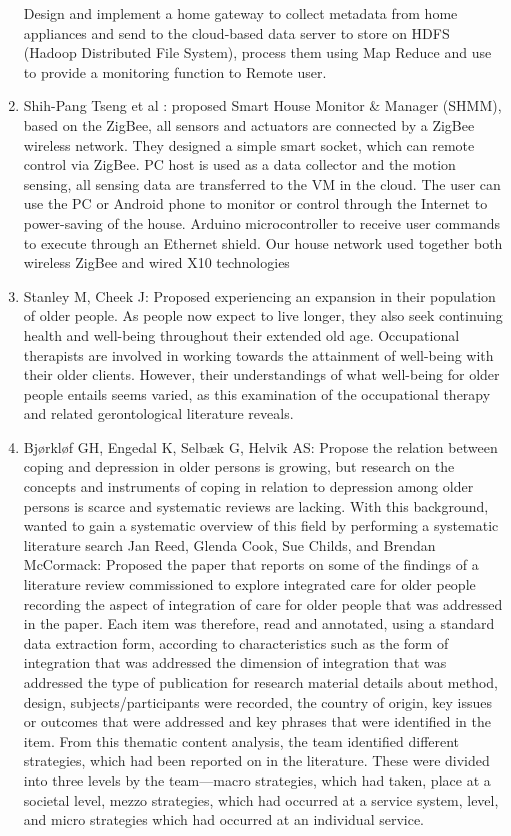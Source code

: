 \begin{enumerate}
	Design and implement a home gateway to collect metadata from home appliances and send to the cloud-based data server to store on HDFS (Hadoop Distributed File System), process them using Map Reduce and use to provide a monitoring function to Remote user.
	\item Shih-Pang Tseng et al : proposed Smart House Monitor \& Manager (SHMM), based on the ZigBee, all sensors and actuators are connected by a ZigBee wireless network. They designed a simple smart socket, which can remote control via ZigBee. PC host is used as a data collector and the motion sensing, all sensing data are transferred to the VM in the cloud. The user can use the PC or Android phone to monitor or control through the Internet to power-saving of the house. Arduino microcontroller to receive user commands to execute through an Ethernet shield. Our house network used together both wireless ZigBee and wired X10 technologies
\item  Stanley M, Cheek J: Proposed experiencing an expansion in their population of older people. As people now expect to live longer, they also seek continuing health and well-being throughout their extended old age. Occupational therapists are involved in working towards the attainment of well-being with their older clients. However, their understandings of what well-being for older people entails seems varied, as this examination of the occupational therapy and related gerontological literature reveals.
	\item  Bjørkløf GH, Engedal K, Selbæk G, Helvik AS: Propose the relation between coping and depression in older persons is growing, but research on the concepts and instruments of coping in relation to depression among older persons is scarce and systematic reviews are lacking. With this background, wanted to gain a systematic overview of this field by performing a systematic literature search Jan Reed, Glenda Cook, Sue Childs, and Brendan McCormack: Proposed the paper that reports on some of the findings of a literature review commissioned to explore integrated care for older people recording the aspect of integration of care for older people that was addressed in the paper. Each item was therefore, read and annotated, using a standard data extraction form, according to characteristics such as the form of integration that was addressed the dimension of integration that was addressed the type of publication for research material details about method, design, subjects/participants were recorded, the country of origin, key issues or outcomes that were addressed and key phrases that were identified in the item. From this thematic content analysis, the team identified different strategies, which had been reported on in the literature. These were divided into three levels by the team—macro strategies, which had taken, place at a societal level, mezzo strategies, which had occurred at a service system, level, and micro strategies which had occurred at an individual service.
\end{enumerate}

